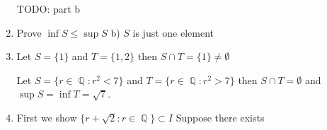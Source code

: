 \documentclass[10pt,a4paper]{article}
\DeclareMathOperator*{\Q}{\mathbb{Q}}
\begin{document}
\begin{enumerate}
        TODO: part b

    \item  Prove $ \inf S \leq \sup S $
        b) $S$ is just one element

    \item Let $S = \{ 1 \} $ and $T = \{1, 2\}$ then $S \cap T = \{ 1 \} \neq \emptyset$

        Let $S = \{ r \in \Q : r^2 < 7 \} $ and $T = \{ r \in \Q : r^2 > 7 \}$ then $S \cap T = \emptyset$ and $\sup S = \inf T = \sqrt7$.

    \item First we show $\{ r + \sqrt2 : r \in \Q\} \subset I$
        Suppose there exists

\end{enumerate}
\end{document}
